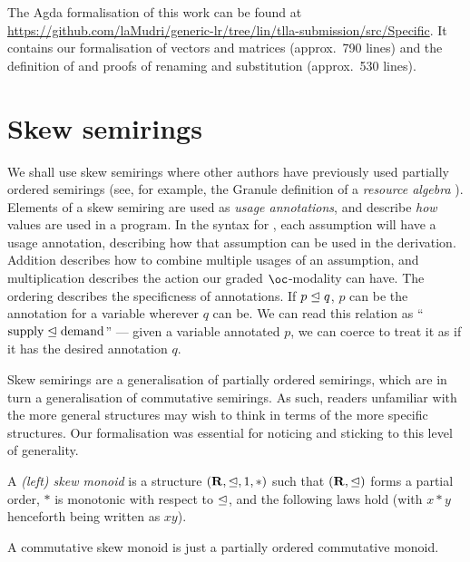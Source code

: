 \documentclass[submission,copyright,creativecommons]{eptcs}
\begin{document}
The Agda formalisation of this work can be found at
\url{https://github.com/laMudri/generic-lr/tree/lin/tlla-submission/src/Specific}.
It contains our formalisation of vectors and
matrices (approx.\ 790 lines) and the definition of \name{} and proofs of
renaming and substitution (approx.\ 530 lines).

\section{Skew semirings}\label{sec:algebra}

We shall use skew semirings where other authors have previously used partially ordered
semirings (see, for example, the Granule definition of a \emph{resource algebra}
\cite{Granule18}).
Elements of a skew semiring are used as \emph{usage annotations}, and describe
\emph{how} values are used in a program.
In the syntax for \name{}, each assumption will have a usage annotation,
describing how that assumption can be used in the derivation.
Addition describes how to combine multiple usages of an assumption, and
multiplication describes the action our graded $\oc$-modality can have.
The ordering describes the specificness of annotations.
If $p \trianglelefteq q$, $p$ can be the annotation for a variable wherever $q$ can be.
We can read this relation as ``$\textrm{supply} \trianglelefteq \textrm{demand}$'' ---
given a variable annotated $p$, we can coerce to treat it as if it has the
desired annotation $q$.

Skew semirings are a generalisation of partially ordered semirings, which are in turn a
generalisation of commutative semirings.
As such, readers unfamiliar with the more general structures may wish to think
in terms of the more specific structures.
Our formalisation was essential for noticing and sticking to this level of
generality.

\begin{definition}
  A \emph{(left) skew monoid} is a structure $(\mathbf R, \trianglelefteq, 1, *)$ such
  that $(\mathbf R, \trianglelefteq)$ forms a partial order, $*$ is monotonic with
  respect to $\trianglelefteq$, and the following laws hold (with $x * y$ henceforth
  being written as $xy$).
\end{definition}

\begin{remark}
  A commutative skew monoid is just a partially ordered commutative monoid.
\end{remark}
\end{document}
